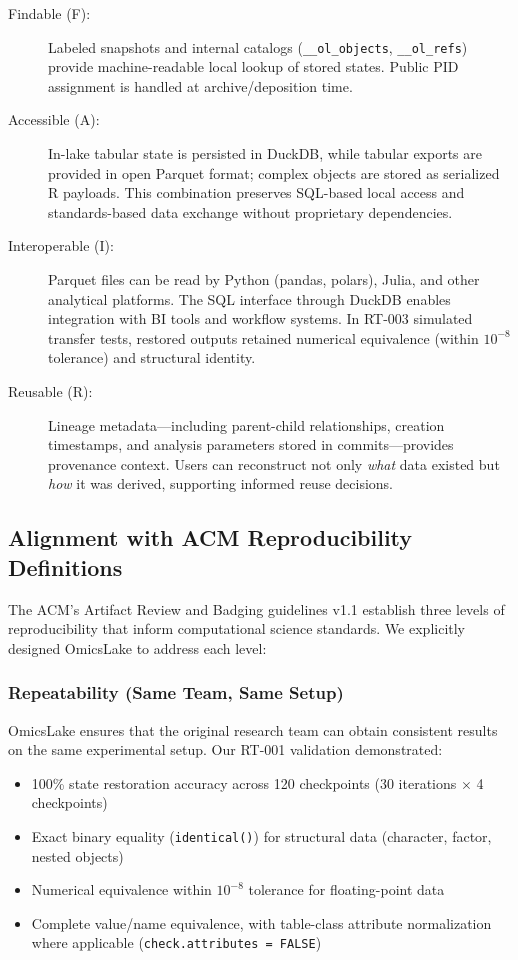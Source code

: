 \documentclass[11pt,a4paper]{article}
\begin{document}
\begin{description}
    \item[Findable (F):] Labeled snapshots and internal catalogs (\texttt{\_\_ol\_objects}, \texttt{\_\_ol\_refs}) provide machine-readable local lookup of stored states. Public PID assignment is handled at archive/deposition time.

    \item[Accessible (A):] In-lake tabular state is persisted in DuckDB, while tabular exports are provided in open Parquet format; complex objects are stored as serialized R payloads. This combination preserves SQL-based local access and standards-based data exchange without proprietary dependencies.

    \item[Interoperable (I):] Parquet files can be read by Python (pandas, polars), Julia, and other analytical platforms. The SQL interface through DuckDB enables integration with BI tools and workflow systems. In RT-003 simulated transfer tests, restored outputs retained numerical equivalence (within $10^{-8}$ tolerance) and structural identity.

    \item[Reusable (R):] Lineage metadata---including parent-child relationships, creation timestamps, and analysis parameters stored in commits---provides provenance context. Users can reconstruct not only \emph{what} data existed but \emph{how} it was derived, supporting informed reuse decisions.
\end{description}

\subsection{Alignment with ACM Reproducibility Definitions}

The ACM's Artifact Review and Badging guidelines v1.1 \citep{acm2020artifact} establish three levels of reproducibility that inform computational science standards. We explicitly designed OmicsLake to address each level:

\subsubsection{Repeatability (Same Team, Same Setup)}

OmicsLake ensures that the original research team can obtain consistent results on the same experimental setup. Our RT-001 validation demonstrated:

\begin{itemize}
    \item 100\% state restoration accuracy across 120 checkpoints (30 iterations $\times$ 4 checkpoints)
    \item Exact binary equality (\texttt{identical()}) for structural data (character, factor, nested objects)
    \item Numerical equivalence within $10^{-8}$ tolerance for floating-point data
    \item Complete value/name equivalence, with table-class attribute normalization where applicable (\texttt{check.attributes = FALSE})
\end{itemize}
\end{document}
